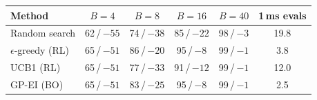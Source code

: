 \begin{tabular}{@{}lccccc@{}}
\toprule
Method & $B=4$ & $B=8$ & $B=16$ & $B=40$ & 1\,ms evals \\
\midrule
Random search & 62\,/\,$-55$ & 74\,/\,$-38$ & 85\,/\,$-22$ & 98\,/\,$-3$ & 19.8 \\
$\epsilon$-greedy (RL) & 65\,/\,$-51$ & 86\,/\,$-20$ & 95\,/\,$-8$ & 99\,/\,$-1$ & 3.8 \\
UCB1 (RL) & 65\,/\,$-51$ & 77\,/\,$-33$ & 91\,/\,$-12$ & 99\,/\,$-1$ & 12.0 \\
GP-EI (BO) & 65\,/\,$-51$ & 83\,/\,$-25$ & 95\,/\,$-8$ & 99\,/\,$-1$ & 2.5 \\
\bottomrule
\end{tabular}
